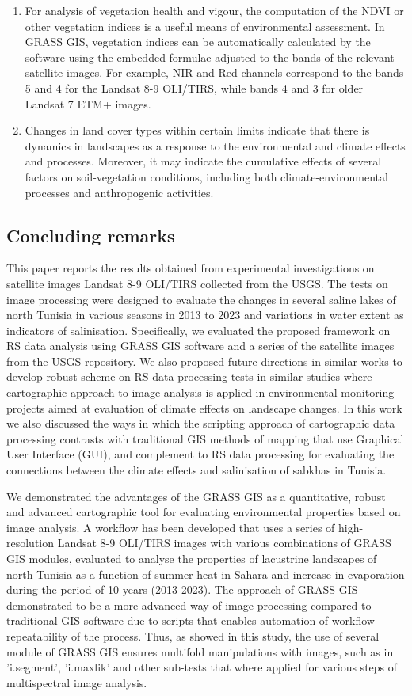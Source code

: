 \documentclass[environments,article,submit,pdftex,moreauthors]{Definitions/mdpi}
\begin{document}
\begin{enumerate}
	\item For analysis of vegetation health and vigour, the computation of the NDVI or other vegetation indices is a useful means of environmental assessment. In GRASS GIS, vegetation indices can be automatically calculated  by the software using the embedded formulae adjusted to the bands of the relevant satellite images. For example, NIR and Red channels correspond to the bands 5 and 4 for the Landsat 8-9 OLI/TIRS, while bands 4 and 3 for older Landsat 7 ETM+ images.
	\item Changes in land cover types within certain limits indicate that there is dynamics in landscapes as a response to the environmental and climate effects and processes. Moreover, it may indicate the cumulative effects of several factors on soil-vegetation conditions, including both climate-environmental processes and anthropogenic activities.
\end{enumerate}

\subsection{Concluding remarks}

This paper reports the results obtained from experimental investigations on satellite images Landsat 8-9 OLI/TIRS collected from the USGS. The tests on image processing were designed to evaluate the changes in several saline lakes of north Tunisia in various seasons in 2013 to 2023 and variations in water extent as indicators of salinisation. Specifically, we evaluated the proposed framework on RS data analysis using GRASS GIS software and a series of the satellite images from the USGS repository. We also proposed future directions in similar works to develop robust scheme on RS data processing tests in similar studies where cartographic approach to image analysis is applied in environmental monitoring projects aimed at evaluation of climate effects on landscape changes. In this work we also discussed the ways in which the scripting approach of cartographic data processing contrasts with traditional GIS methods of mapping that use Graphical User Interface (GUI), and complement to RS data processing for evaluating the connections between the climate effects and salinisation of sabkhas in Tunisia. 

We demonstrated the advantages of the GRASS GIS as a quantitative, robust and advanced cartographic tool for evaluating environmental properties based on image analysis. A workflow has been developed that uses a series of high-resolution Landsat 8-9 OLI/TIRS images with various combinations of GRASS GIS modules, evaluated to analyse the properties of lacustrine landscapes  of north Tunisia as a function of summer heat in Sahara and increase in evaporation during the period of 10 years (2013-2023). The approach of GRASS GIS demonstrated to be a more advanced way of image processing compared to traditional GIS software due to scripts that enables automation of workflow repeatability of the process. Thus, as showed in this study, the use of several module of GRASS GIS ensures multifold manipulations with images, such as in 'i.segment', 'i.maxlik' and other sub-tests that where applied for various steps of multispectral image analysis. 
\end{document}
